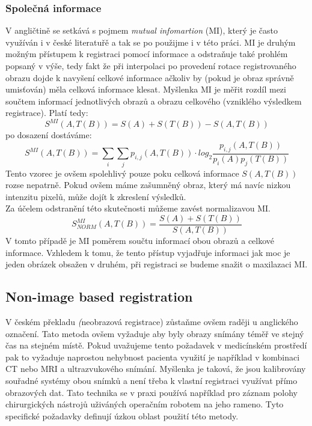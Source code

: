 \documentclass{thesis}%
\begin{document}
\subsubsection{Společná informace}
V angličtině se setkává s pojmem \textit{mutual infomartion} (MI), který je často využíván i v české literatuřě a tak se po použijme i v této práci. MI je druhým možným přístupem k registraci pomocí informace a odstraňuje také prohlém popsaný v výše, tedy fakt že při interpolaci po provedení rotace registrovaného obrazu dojde k navyšení celkové informace ačkoliv by (pokud je obraz správně umisťován) měla celková informace klesat. Myšlenka MI je měřit rozdíl mezi součtem informací jednotlivých obrazů a obrazu celkového (vzniklého výsledkem registrace). Platí tedy:
\begin{equation}
S^{MI}(A, T(B)) = S(A) + S(T(B)) - S(A,T(B))
\end{equation}
po dosazení dostáváme:
\begin{equation}
S^{MI}(A, T(B)) = \sum\limits_i \sum\limits_j p_{i,j} (A,T(B))\cdot log_2 \frac{p_{i,j} (A,T(B))}{p_i(A)p_j(T(B))}
\end{equation}
Tento vzorec je ovšem spolehlivý pouze poku celková informace $S(A,T(B))$ rozse nepatrně. Pokud ovšem máme zašumněný obraz, který má navíc nizkou intenzitu pixelů, může dojít k zkreslení výsledků.\\Za účelem odstranění této skutečnosti můžeme zavést normalizavou MI.
\begin{equation}
S_{NORM}^{MI}(A, T(B)) =\frac{S(A)+S(T(B))}{S (A,T(B))}
\end{equation}
V tomto případě je MI poměrem součtu informací obou obrazů a celkové informace. Vzhledem k tomu, že tento přístup vyjadřuje informaci jak moc je jeden obrázek obsažen v druhém, při registraci se budeme snažit o maxilazaci MI.

\subsection{Non-image based registration}
V českém překladu \textit(neobrazová registrace) zůstaňme ovšem raději u anglického označení. Tato metoda ovšem vyžaduje aby byly obrazy snímány téměř ve stejný čas na stejném místě. Pokud uvažujeme tento požadavek v medicínském prostředí pak to vyžaduje naprostou nehybnost pacienta využití je například v kombinaci CT nebo MRI a ultrazvukového snímání. Myšlenka je taková, že jsou kalibrovány souřadné systémy obou snímků a není třeba k vlastní registraci využívat přímo obrazových dat. Tato technika se v praxi používá například pro záznam polohy chirurgických nástrojů uživáných operačním robotem na jeho rameno. Tyto specifické požadavky definují úzkou oblast použití této metody. 
\end{document}
